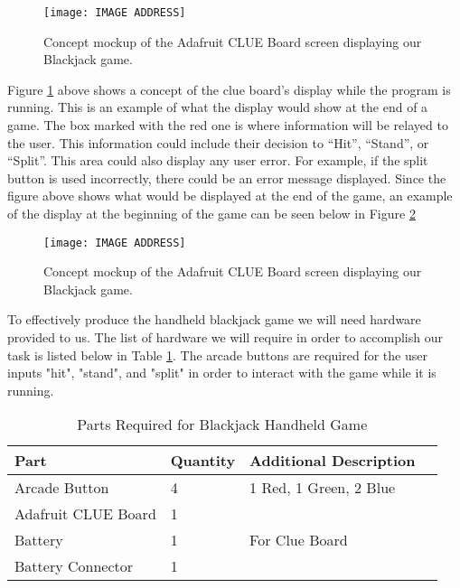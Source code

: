 \documentclass[12pt]{article}
\begin{document}
\begin{figure}[ht]
\centering
\texttt{[image: IMAGE ADDRESS]}  %
\caption{Concept mockup of the Adafruit CLUE Board screen displaying our Blackjack game.}
\label{fig:blackjack1}
\end{figure}

Figure \ref{fig:blackjack1} above shows a concept of the clue board’s display while the program is running. This is an example of what the display would show at the end of a game. The box marked with the red one is where information will be relayed to the user. This information could include their decision to “Hit”, “Stand”, or “Split”. This area could also display any user error. For example, if the split button is used incorrectly, there could be an error message displayed. Since the figure above shows what would be displayed at the end of the game, an example of the display at the beginning of the game can be seen below in Figure \ref{fig:blackjack2}

\begin{figure}[ht]
\centering
\texttt{[image: IMAGE ADDRESS]} %
\caption{Concept mockup of the Adafruit CLUE Board screen displaying our Blackjack game.}
\label{fig:blackjack2}
\end{figure}

To effectively produce the handheld blackjack game we will need hardware provided to us. The list of hardware we will require in order to accomplish our task is listed below in Table \ref{table:parts_list}. The arcade buttons are required for the user inputs "hit", "stand", and "split" in order to interact with the game while it is running.

\begin{table}[ht]
\centering
\begin{tabular}{|l|l|l|l|}
    \hline
    \textbf{Part} & \textbf{Quantity} & \textbf{Additional Description} \\ \hline
    Arcade Button & 4 & 1 Red, 1 Green, 2 Blue \\ \hline
    Adafruit CLUE Board & 1 &  \\ \hline
    Battery & 1 & For Clue Board \\ \hline
    Battery Connector & 1 &  \\ \hline
\end{tabular}
\caption{Parts Required for Blackjack Handheld Game}
\label{table:parts_list}
\end{table}
\end{document}
